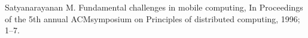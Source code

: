 \documentclass[10pt, conference, compsocconf]{IEEEtran}
\begin{document}
%
%
%
\begin{thebibliography}{16}
%
%

Satyanarayanan M. Fundamental challenges in mobile computing, In Proceedings of the 5th annual ACMsymposium on Principles of distributed computing, 1996; 1–7.


\end{thebibliography}
\end{document}
